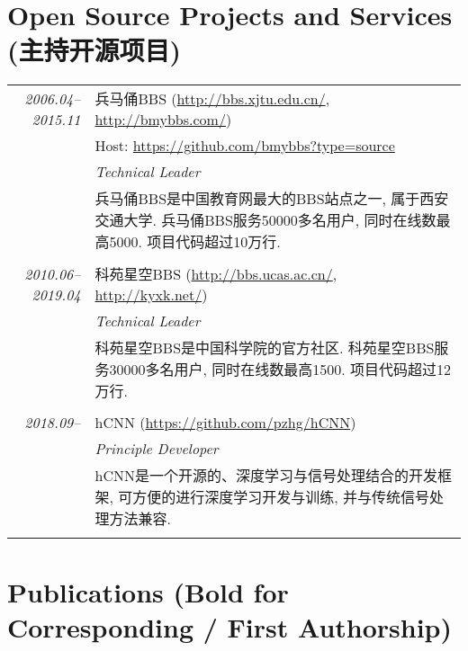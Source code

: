 \documentclass[paper=a4,fontsize=11pt]{scrartcl}
\begin{document}
\section*{Open Source Projects and Services (主持开源项目)}

\begin{longtable}{r|p{11cm}}
	\emph{2006.04--2015.11} & 兵马俑BBS (\href{http://bbs.xjtu.edu.cn/}{http://bbs.xjtu.edu.cn/}, \href{http://bmybbs.com/}{http://bmybbs.com/}) \\
	& Host: \href{https://github.com/bmybbs?type=source}{https://github.com/bmybbs?type=source} \\
	& \emph{Technical Leader} \\ 
	& \footnotesize{兵马俑BBS是中国教育网最大的BBS站点之一, 属于西安交通大学. 兵马俑BBS服务50000多名用户, 同时在线数最高5000. 项目代码超过10万行.}\\
	\multicolumn{2}{c}{} \\
	
	\emph{2010.06--2019.04} & 科苑星空BBS (\href{http://bbs.ucas.ac.cn/}{http://bbs.ucas.ac.cn/}, \href{http://kyxk.net/}{http://kyxk.net/}) \\
	& \emph{Technical Leader} \\ 
	& \footnotesize{科苑星空BBS是中国科学院的官方社区. 科苑星空BBS服务30000多名用户, 同时在线数最高1500. 项目代码超过12万行.}\\
	\multicolumn{2}{c}{} \\
	
	\emph{2018.09--} & hCNN (\href{https://github.com/pzhg/hCNN}{https://github.com/pzhg/hCNN}) \\
	& \emph{Principle Developer} \\ 
	& \footnotesize{hCNN是一个开源的、深度学习与信号处理结合的开发框架, 可方便的进行深度学习开发与训练, 并与传统信号处理方法兼容.}\\
	\multicolumn{2}{c}{} 
	
\end{longtable}



\section*{Publications (Bold for Corresponding / First Authorship)}

%
%
\end{document}
